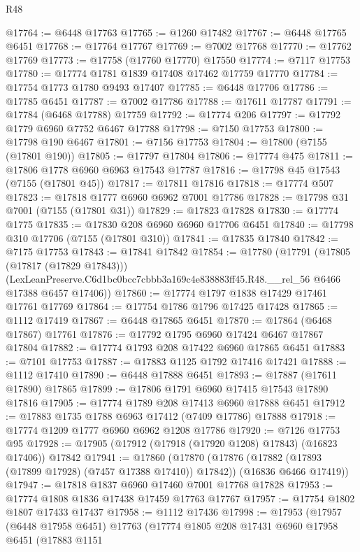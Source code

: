 \begin{lexlean}{R48}
\begin{coremodule}
@17764 := @6448 @17763
@17765 := @1260 @17482
@17767 := @6448 @17765 @6451
@17768 := @17764 @17767
@17769 := @7002 @17768
@17770 := @17762 @17769
@17773 := @17758 (@17760 @17770) @17550
@17774 := @7117 @17753
@17780 := @17774 @1781 @1839 @17408 @17462 @17759 @17770
@17784 := @17754 @1773 @1780 @9493 @17407
@17785 := @6448 @17706
@17786 := @17785 @6451
@17787 := @7002 @17786
@17788 := @17611 @17787
@17791 := @17784 (@6468 @17788) @17759
@17792 := @17774 @206
@17797 := @17792 @1779 @6960 @7752 @6467 @17788
@17798 := @7150 @17753
@17800 := @17798 @190 @6467
@17801 := @7156 @17753
@17804 := @17800 (@7155 (@17801 @190))
@17805 := @17797 @17804
@17806 := @17774 @475
@17811 := @17806 @1778 @6960 @6963 @17543 @17787
@17816 := @17798 @45 @17543 (@7155 (@17801 @45))
@17817 := @17811 @17816
@17818 := @17774 @507
@17823 := @17818 @1777 @6960 @6962 @7001 @17786
@17828 := @17798 @31 @7001 (@7155 (@17801 @31))
@17829 := @17823 @17828
@17830 := @17774 @1775
@17835 := @17830 @208 @6960 @6960 @17706 @6451
@17840 := @17798 @310 @17706 (@7155 (@17801 @310))
@17841 := @17835 @17840
@17842 := @7175 @17753
@17843 := @17841 @17842
@17854 := @17780
    (@17791
      (@17805 (@17817 (@17829 @17843)))
      (LexLeanPreserve.C6d1bc0bcc7cbbb3a169c4e838883ff45.R48.__rel_56 @6466 @17388 @6457 @17406))
@17860 := @17774 @1797 @1838 @17429 @17461 @17761 @17769
@17864 := @17754 @1786 @1796 @17425 @17428
@17865 := @1112 @17419
@17867 := @6448 @17865 @6451
@17870 := @17864 (@6468 @17867) @17761
@17876 := @17792 @1795 @6960 @17424 @6467 @17867 @17804
@17882 := @17774 @1793 @208 @17422 @6960 @17865 @6451
@17883 := @7101 @17753
@17887 := @17883 @1125 @1792 @17416 @17421
@17888 := @1112 @17410
@17890 := @6448 @17888 @6451
@17893 := @17887 (@17611 @17890) @17865
@17899 := @17806 @1791 @6960 @17415 @17543 @17890 @17816
@17905 := @17774 @1789 @208 @17413 @6960 @17888 @6451
@17912 := @17883 @1735 @1788 @6963 @17412 (@7409 @17786) @17888
@17918 := @17774 @1209 @1777 @6960 @6962 @1208 @17786
@17920 := @7126 @17753 @95
@17928 := @17905 (@17912 (@17918 (@17920 @1208) @17843) (@16823 @17406)) @17842
@17941 := @17860
    (@17870
      (@17876 (@17882 (@17893 (@17899 @17928) (@7457 @17388 @17410)) @17842))
      (@16836 @6466 @17419))
@17947 := @17818 @1837 @6960 @17460 @7001 @17768 @17828
@17953 := @17774 @1808 @1836 @17438 @17459 @17763 @17767
@17957 := @17754 @1802 @1807 @17433 @17437
@17958 := @1112 @17436
@17998 := @17953
    (@17957
      (@6448 @17958 @6451)
      @17763
      (@17774
        @1805
        @208
        @17431
        @6960
        @17958
        @6451
        (@17883
          @1151

\end{coremodule}
\end{lexlean}
